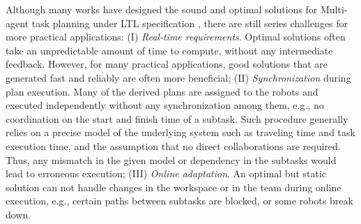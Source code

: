 Although many works have designed the sound and optimal solutions for Multi-agent task planning under LTL specification
\cite{LAVAEI2022110617}, there are still series challenges for more practical applications:
(I) \emph{Real-time requirements}.
Optimal solutions often take an unpredictable amount of time to compute,
without any intermediate feedback.
However, for many practical applications,
good solutions that are generated fast and reliably are often more beneficial;
(II) \emph{Synchronization} during plan execution.
Many of the derived plans are assigned to the robots
and executed independently without any synchronization among them,
e.g., no coordination on the start and finish time of a subtask.
Such procedure generally relies on a precise model of the underlying system
such as traveling time and task execution time,
and the assumption that no direct collaborations are required.
Thus, any mismatch in the given model or dependency in the subtasks would lead to erroneous execution;
(III) \emph{Online adaptation}.
An optimal but static solution can not handle changes in the workspace or in the team during
online execution, e.g., certain paths between subtasks are blocked, or some robots break down.



